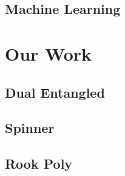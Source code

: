 \documentclass{report}
\begin{document}
\subsection{Machine Learning}




\section{Our Work}

\subsection{Dual Entangled}

\subsection{Spinner}

\subsection{Rook Poly}



\end{document}
